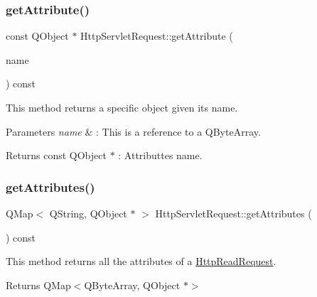 \subsubsection{\texorpdfstring{get\+Attribute()}{getAttribute()}}
{\footnotesize\ttfamily const Q\+Object $\ast$ Http\+Servlet\+Request\+::get\+Attribute (\begin{DoxyParamCaption}\item[{const Q\+String \&}]{name }\end{DoxyParamCaption}) const}



This method returns a specific object given its name. 


\begin{DoxyParams}{Parameters}
{\em name} & \+: This is a reference to a Q\+Byte\+Array. \\
\hline
\end{DoxyParams}
\begin{DoxyReturn}{Returns}
const Q\+Object $\ast$ \+: Attributte\textquotesingle{}s name. 
\end{DoxyReturn}
\mbox{\label{class_http_servlet_request_add50206d719a748a2162610fd30f060e}} 
\subsubsection{\texorpdfstring{get\+Attributes()}{getAttributes()}}
{\footnotesize\ttfamily Q\+Map$<$ Q\+String, Q\+Object $\ast$ $>$ Http\+Servlet\+Request\+::get\+Attributes (\begin{DoxyParamCaption}{ }\end{DoxyParamCaption}) const}



This method returns all the attributes of a \hyperlink{class_http_read_request}{Http\+Read\+Request}. 

\begin{DoxyReturn}{Returns}
Q\+Map$<$\+Q\+Byte\+Array, Q\+Object $\ast$$>$ 
\end{DoxyReturn}
\mbox{\label{class_http_servlet_request_a8c20ab8bd4ce24c33500b333b301e960}} 
